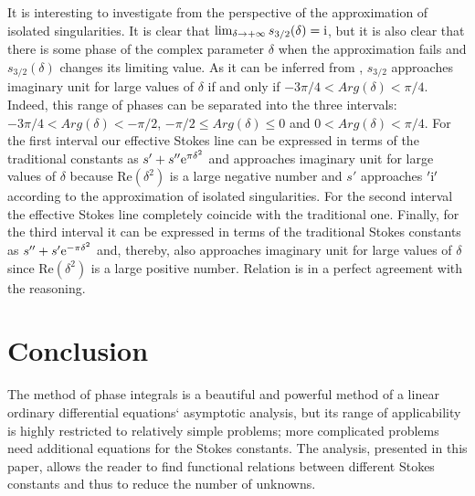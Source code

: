 \documentclass[12pt]{iopart}
\def\Re{\mathrm{Re}}
\begin{document}
It is interesting to investigate  from the perspective of the approximation
of isolated singularities. It is clear that $\lim_{\delta\to +\infty} s_{3/2}(\delta) = \mathrm{i}$,
but it is also clear that there is some phase of the complex parameter $\delta$ when the approximation
fails and $s_{3/2}(\delta)$ changes its limiting value. As it can be inferred from ,
$s_{3/2}$ approaches imaginary unit for large values of $\delta$ if and only if
$-3\pi/4 < Arg(\delta) < \pi/4$. Indeed, this range of phases can be separated into the three intervals:
$-3\pi/4 < Arg(\delta) < -\pi/2$, $-\pi/2 \leq Arg(\delta) \leq 0$ and $0 < Arg(\delta) < \pi/4$.
For the first interval our effective Stokes line can be expressed in terms of the traditional constants
as $s' + s''\mathrm{e}^{\pi\delta^2}$ and approaches imaginary unit for large values of $\delta$ because 
$\Re(\delta^2)$ is a large negative number and $s'$ approaches $'\mathrm{i}'$ according to the approximation 
of isolated singularities. For the second interval the effective Stokes line completely coincide with
the traditional one. Finally, for the third interval it can be expressed in terms of
the traditional Stokes constants as $s'' + s'\mathrm{e}^{-\pi\delta^2}$ and, thereby, also
approaches imaginary unit for large values of $\delta$ since $\Re(\delta^2)$ is a large positive number.
Relation  is in a perfect agreement with the reasoning.
    

\section{Conclusion \label{sec:cnclsns}}

The method of phase integrals is a beautiful and powerful method of a linear ordinary 
differential equations` asymptotic analysis, but its range of applicability is highly 
restricted to relatively simple problems; more complicated problems need additional equations 
for the Stokes constants. The analysis, presented in this paper, allows the reader to find 
functional relations between different Stokes constants and thus to reduce the number of unknowns.
\end{document}

